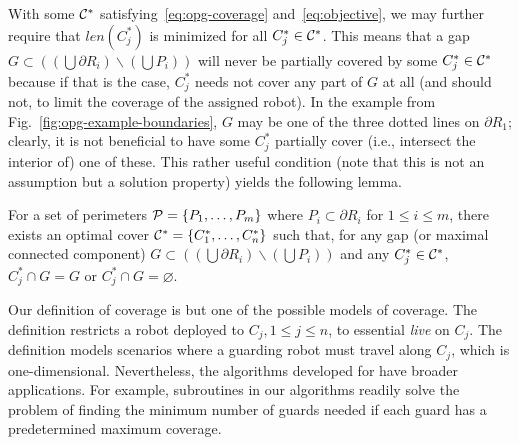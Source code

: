 With some $\C^*$ satisfying~\eqref{eq:opg-coverage} 
and~\eqref{eq:objective}, we may further require that $len(C_j^*)$ is 
minimized for all $C_j^* \in \C^*$. This means that a gap $G \subset 
((\bigcup \partial R_i)\backslash (\bigcup P_i))$ will never be partially 
covered by some $C_j^* \in \C^*$ because if that is the case, $C_j^*$ 
needs not cover any part of $G$ at all (and should not, to limit the 
coverage of the assigned robot). In the example from 
Fig.~\ref{fig:opg-example-boundaries}, $G$ may be one of the three dotted 
lines on $\partial R_1$; clearly, it is not beneficial to have some 
$C_j^*$ partially cover (i.e., intersect the interior of) one of these. 
This rather useful condition (note that this is not an assumption but 
a solution property) yields the following lemma. 

\begin{lemma}\label{l:opg-no-partial-coverage} 
For a set of perimeters $\P = \{P_1,\ldots, P_m\}$ where $P_i \subset 
\partial R_i$ for $1 \le i \le m$, there exists an optimal cover $\C^* 
= \{C_1^*, \ldots, C_n^*\}$ such that, for any gap (or maximal connected
component) $G \subset ((\bigcup \partial R_i)\backslash (\bigcup P_i))$ 
and any $C_j^* \in \C^*$, $C_j^* \cap G = G$ or $C_j^* \cap G = 
\varnothing$. 
\end{lemma}

\begin{remark} Our definition of coverage is but one of the possible 
models of coverage. The definition restricts a robot deployed to 
$C_j, 1 \le j \le n$, to essential {\em live} on $C_j$. The definition 
models scenarios where a guarding robot must travel along $C_j$, which 
is one-dimensional. Nevertheless, the algorithms developed for \opg have 
broader applications. For example, subroutines in our algorithms readily 
solve the problem of finding the minimum number of guards needed if each 
guard has a predetermined maximum coverage. 
\end{remark}
